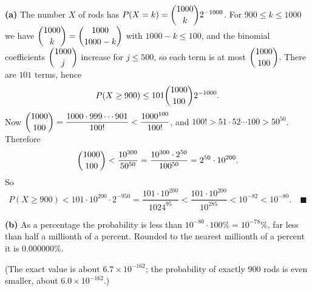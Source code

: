 \textbf{(a)} The number $X$ of rods has $P(X=k)=\dbinom{1000}{k}2^{-1000}$. For $900\le k\le1000$ we have $\dbinom{1000}{k}=\dbinom{1000}{1000-k}$ with $1000-k\le100$, and the binomial coefficients $\dbinom{1000}{j}$ increase for $j\le500$, so each term is at most $\dbinom{1000}{100}$. There are $101$ terms, hence
\[P(X\ge900)\le101\dbinom{1000}{100}2^{-1000}.\]
Now $\dbinom{1000}{100}=\dfrac{1000\cdot999\cdots901}{100!}<\dfrac{1000^{100}}{100!}$, and $100!>51\cdot52\cdots100>50^{50}$. Therefore
\[\dbinom{1000}{100}<\dfrac{10^{300}}{50^{50}}=\dfrac{10^{300}\cdot2^{50}}{100^{50}}=2^{50}\cdot10^{200}.\]
So
\[P(X\ge900)<101\cdot10^{200}\cdot2^{-950}=\dfrac{101\cdot10^{200}}{1024^{95}}<\dfrac{101\cdot10^{200}}{10^{285}}<10^{-82}<10^{-80}.\quad\blacksquare\]

\textbf{(b)} As a percentage the probability is less than $10^{-80}\cdot100\%=10^{-78}\%$, far less than half a millionth of a percent. Rounded to the nearest millionth of a percent it is $\boxed{0.000000\%}$.

(The exact value is about $6.7\times10^{-162}$; the probability of exactly $900$ rods is even smaller, about $6.0\times10^{-162}$.)
